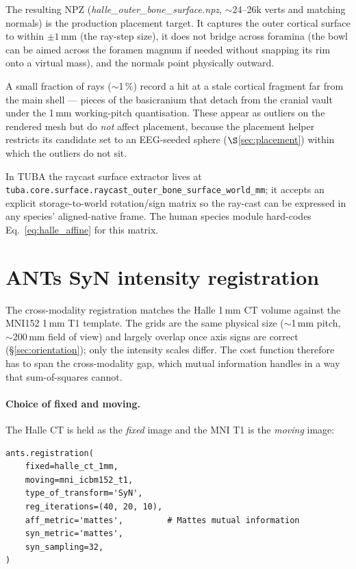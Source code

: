 \documentclass{compactarticle}
\begin{document}
The resulting NPZ ({\em halle\_outer\_bone\_surface.npz}, $\sim$24--26k
verts and matching normals) is the production placement target. It
captures the outer cortical surface to within $\pm 1$\,mm (the ray-step
size), it does not bridge across foramina (the bowl can be aimed across
the foramen magnum if needed without snapping its rim onto a virtual
mass), and the normals point physically outward.

A small fraction of rays ($\sim$1\,\%) record a hit at a stale cortical
fragment far from the main shell --- pieces of the basicranium that
detach from the cranial vault under the 1\,mm working-pitch
quantisation. These appear as outliers on the rendered mesh but do
{\em not} affect placement, because the placement helper restricts its
candidate set to an EEG-seeded sphere ($\S$\ref{sec:placement}) within
which the outliers do not sit.

In TUBA the raycast surface extractor lives at
\texttt{tuba.core.surface.raycast\_outer\_bone\_surface\_world\_mm};
it accepts an explicit storage-to-world rotation/sign matrix so the
ray-cast can be expressed in any species' aligned-native frame. The
human species module hard-codes Eq.~\ref{eq:halle_affine} for this
matrix.

\section{ANTs SyN intensity registration}\label{sec:registration}
The cross-modality registration matches the Halle 1\,mm CT volume
against the MNI152 1\,mm T1 template. The grids are the same physical
size ($\sim$1\,mm pitch, $\sim$200\,mm field of view) and largely
overlap once axis signs are correct (\S\ref{sec:orientation}); only the
intensity scales differ. The cost function therefore has to span the
cross-modality gap, which mutual information handles in a way that
sum-of-squares cannot.

\paragraph{Choice of fixed and moving.}
The Halle CT is held as the {\em fixed} image and the MNI T1 is the
{\em moving} image:

\begin{verbatim}
ants.registration(
    fixed=halle_ct_1mm,
    moving=mni_icbm152_t1,
    type_of_transform='SyN',
    reg_iterations=(40, 20, 10),
    aff_metric='mattes',         # Mattes mutual information
    syn_metric='mattes',
    syn_sampling=32,
)
\end{verbatim}
\end{document}
